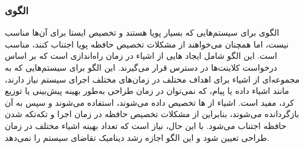 \subsubsection{الگوی }
\label{memPoolAllocSec}
\begin{RTL}
الگوی  برای سیستم‌هایی که بسیار پویا هستند
و تخصیص ایستا برای آن‌ها مناسب نیست، اما همچنان می‌خواهند از
مشکلات تخصیص حافظه پویا اجتناب کنند، مناسب است.
این الگو شامل ایجاد هایی از اشیاء در زمان راه‌اندازی است که
بر اساس درخواست کلاینت‌ها در دسترس قرار می‌گیرند.
این الگو برای سیستم‌هایی که به مجموعه‌ای از اشیاء برای اهداف مختلف
در زمان‌های مختلف اجرای سیستم نیاز دارند، مانند اشیاء داده یا پیام،
که نمی‌توان در زمان طراحی به‌طور بهینه پیش‌بینی یا توزیع کرد، مفید است.
اشیاء از ها تخصیص داده می‌شوند، استفاده می‌شوند
و سپس به آن بازگردانده می‌شوند، بنابراین از مشکلات تخصیص حافظه
در زمان اجرا و تکه‌تکه شدن حافظه اجتناب می‌شود.
با این حال، نیاز است که تعداد بهینه اشیاء مختلف در
زمان طراحی تعیین شود و این الگو اجازه رشد دینامیک تقاضای سیستم را نمی‌دهد.
\end{RTL}